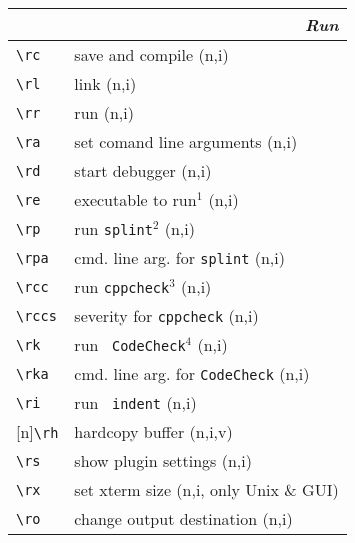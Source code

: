 \documentclass[oneside,11pt,landscape,DIV16]{scrartcl}
\newcommand{\Rep}{{\tiny{[n]}}}
\begin{document}
\begin{multicols}{3}
\begin{center}
\begin{tabular}[]{|p{12mm}|p{60mm}|}
\hline 
\end{tabular}
%
\vspace{100mm}
\begin{tabular}[]{|p{12mm}|p{58mm}|}
\hline
\multicolumn{2}{|r|}{\textsl{\textbf{R}un}} \\
\hline \verb'\rc'  & save and compile                        \hfill (n,i)\\
\hline \verb'\rl'  & link                                    \hfill (n,i)\\
\hline \verb'\rr'  & run                                     \hfill (n,i)\\
\hline \verb'\ra'  & set comand line arguments               \hfill (n,i)\\
\hline \verb'\rd'  & start debugger                          \hfill (n,i)\\
\hline \verb'\re'  & executable to run$^1$                   \hfill (n,i)\\
%
\hline \verb'\rp'  & run \texttt{splint}$^2$                 \hfill (n,i)\\
\hline \verb'\rpa' & cmd. line arg. for \texttt{splint}      \hfill (n,i)\\
%
\hline \verb'\rcc' & run \texttt{cppcheck}$^3$               \hfill (n,i)\\
\hline \verb'\rccs'& severity for \texttt{cppcheck}          \hfill (n,i)\\
%
\hline \verb'\rk'  & run \texttt{ CodeCheck}$^4$             \hfill (n,i)\\
\hline \verb'\rka' & cmd. line arg. for \texttt{CodeCheck}   \hfill (n,i)\\
%
\hline \verb'\ri'  & run \texttt{ indent}        \hfill (n,i)\\
\hline \Rep\verb'\rh'  & hardcopy buffer         \hfill (n,i,v)\\
\hline \verb'\rs'  & show plugin settings        \hfill (n,i)\\
\hline \verb'\rx'  & set xterm size              \hfill (n,i, only Unix \& GUI)\\
\hline \verb'\ro'  & change output destination   \hfill (n,i)\\

\end{tabular}
\end{center}
\end{multicols}
\end{document}
